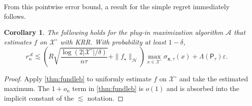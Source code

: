 \documentclass{article}
\numberwithin{theorem}{section}
\newtheorem{corollary}[theorem]{Corollary}
\theoremstyle{definition}
\newcommand{\fwithin}{f_\star}
\newcommand{\Hs}{\mathcal H}
\newcommand{\Xs}{\mathcal X}
\begin{document}
From this pointwise error bound, a result for the simple regret immediately follows.
\begin{corollary}\label{cor:unif_to_regret}
    The following holds for the plug-in maximization algorithm $\mathscr A$ that estimates $f$ on $\Xs^\circ$ with KRR.
    With probability at least $1-\delta$,
    $$r_n^{\mathscr A}\lesssim \left(R\sqrt{\frac{\log(2|\Xs^\circ|/\delta)}{n\tau}}+\|\fwithin\|_{\Hs}\right)\max_{x\in \Xs^\circ}\sigma_{\bm x,\tau}(x) +\Lambda(\mathsf{P}_{\tau})\varepsilon.$$
\end{corollary}
\begin{proof}
    Apply \cref{thm:fundleb} to uniformly estimate $f$ on $\Xs^\circ$ and take the estimated maximum. The $1+o_n$ term in \cref{thm:fundleb} is $o(1)$ and is absorbed into the implicit constant of the $\lesssim$ notation.
\end{proof}
\end{document}
